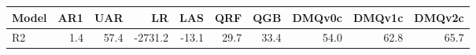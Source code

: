 \begin{tabular}{lrrrrrrrrr}
\toprule
Model & AR1 & UAR & LR & LAS & QRF & QGB & DMQv0c & DMQv1c & DMQv2c \\
\midrule
R2 & 1.4 & 57.4 & -2731.2 & -13.1 & 29.7 & 33.4 & 54.0 & 62.8 & 65.7 \\
\bottomrule
\end{tabular}
